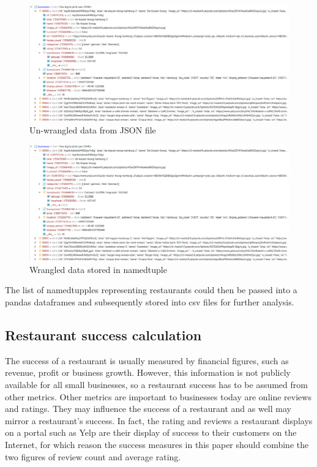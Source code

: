 \documentclass[a4paper, 11pt, oneside]{Thesis}  %
\begin{document}
\begin{figure}[h]
\includegraphics[scale=0.4]{Figures/restaurants_unwrangled.png}
\centering
\caption{Un-wrangled data from JSON file}
\label{fig:un-wrangled data from JSON file}
\end{figure}

\begin{figure}[h]
\includegraphics[scale=0.4]{Figures/restaurants_unwrangled.png}
\centering
\caption{Wrangled data stored in namedtuple}
\label{fig:wranged data stored in namedtuple}
\end{figure}

The list of namedtupples representing restaurants could then be passed into a pandas dataframes and subsequently stored into \ac{csv} files for further analysis.


\subsection{Restaurant success calculation}

The success of a restaurant is usually measured by financial figures, such as revenue, profit or business growth. However, this information is not publicly available for all small businesses, so a restaurant success has to be assumed from other metrics. Other metrics are important to businesses today are online reviews and ratings. They may influence the success of a restaurant and as well may mirror a restaurant's success. In fact, the rating and reviews a restaurant displays on a portal such as Yelp are their display of success to their customers on the Internet, for which reason the success measures in this paper should combine the two figures of review count and average rating.
\end{document}
